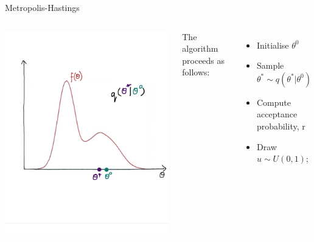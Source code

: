 \documentclass[compress]{beamer}
\begin{document}
\begin{frame}[label=sec-7-10]{Metropolis-Hastings}
\begin{columns}[c] 
\includegraphics[width=0.8\linewidth]{MH2}

The algorithm proceeds as follows:\\
\begin{itemize}
\item Initialise $\theta^{0}$
\item Sample $\theta^* \sim q(\theta^*|\theta^{0})$
\item Compute acceptance probability, r
\item Draw $u \sim U(0,1)$;
\end{itemize}
\end{columns}
\end{frame}
\end{document}
